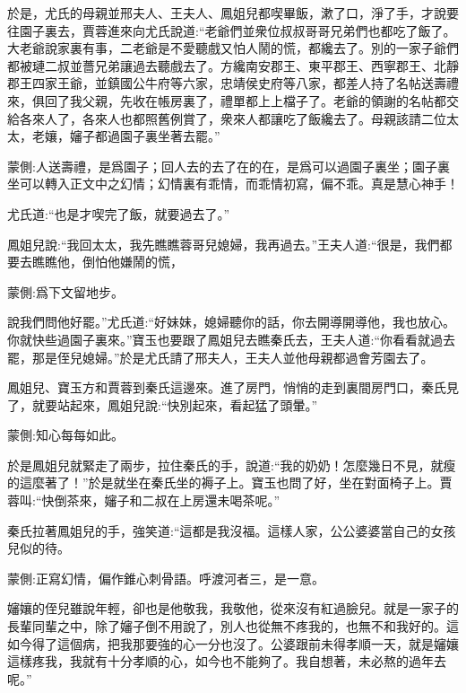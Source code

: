\begin{parag}
    於是，尤氏的母親並邢夫人、王夫人、鳳姐兒都喫畢飯，漱了口，淨了手，才說要往園子裏去，賈蓉進來向尤氏說道:“老爺們並衆位叔叔哥哥兄弟們也都吃了飯了。大老爺說家裏有事，二老爺是不愛聽戲又怕人鬧的慌，都纔去了。別的一家子爺們都被璉二叔並薔兄弟讓過去聽戲去了。方纔南安郡王、東平郡王、西寧郡王、北靜郡王四家王爺，並鎮國公牛府等六家，忠靖侯史府等八家，都差人持了名帖送壽禮來，俱回了我父親，先收在帳房裏了，禮單都上上檔子了。老爺的領謝的名帖都交給各來人了，各來人也都照舊例賞了，衆來人都讓吃了飯纔去了。母親該請二位太太，老孃，嬸子都過園子裏坐著去罷。”\begin{note}蒙側:人送壽禮，是爲園子；回人去的去了在的在，是爲可以過園子裏坐；園子裏坐可以轉入正文中之幻情；幻情裏有乖情，而乖情初寫，偏不乖。真是慧心神手！\end{note}尤氏道:“也是才喫完了飯，就要過去了。”
\end{parag}


\begin{parag}
    鳳姐兒說:“我回太太，我先瞧瞧蓉哥兒媳婦，我再過去。”王夫人道:“很是，我們都要去瞧瞧他，倒怕他嫌鬧的慌，\begin{note}蒙側:爲下文留地步。\end{note}說我們問他好罷。”尤氏道:“好妹妹，媳婦聽你的話，你去開導開導他，我也放心。你就快些過園子裏來。”寶玉也要跟了鳳姐兒去瞧秦氏去，王夫人道:“你看看就過去罷，那是侄兒媳婦。”於是尤氏請了邢夫人，王夫人並他母親都過會芳園去了。
\end{parag}


\begin{parag}
    鳳姐兒、寶玉方和賈蓉到秦氏這邊來。進了房門，悄悄的走到裏間房門口，秦氏見了，就要站起來，鳳姐兒說:“快別起來，看起猛了頭暈。”\begin{note}蒙側:知心每每如此。\end{note}於是鳳姐兒就緊走了兩步，拉住秦氏的手，說道:“我的奶奶！怎麼幾日不見，就瘦的這麼著了！”於是就坐在秦氏坐的褥子上。寶玉也問了好，坐在對面椅子上。賈蓉叫:“快倒茶來，嬸子和二叔在上房還未喝茶呢。”
\end{parag}


\begin{parag}
    秦氏拉著鳳姐兒的手，強笑道:“這都是我沒福。這樣人家，公公婆婆當自己的女孩兒似的待。\begin{note}蒙側:正寫幻情，偏作錐心刺骨語。呼渡河者三，是一意。\end{note}嬸孃的侄兒雖說年輕，卻也是他敬我，我敬他，從來沒有紅過臉兒。就是一家子的長輩同輩之中，除了嬸子倒不用說了，別人也從無不疼我的，也無不和我好的。這如今得了這個病，把我那要強的心一分也沒了。公婆跟前未得孝順一天，就是嬸孃這樣疼我，我就有十分孝順的心，如今也不能夠了。我自想著，未必熬的過年去呢。”
\end{parag}



